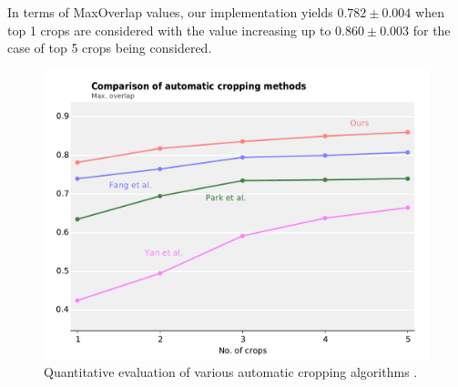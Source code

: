 In terms of \textrm{MaxOverlap} values, our implementation yields $0.782\pm0.004$
when top 1 crops are considered with the value increasing up to $0.860\pm0.003$
for the case of top 5 crops being considered.

\begin{figure}
\centering\includegraphics[width=\columnwidth]{../figures/comparison.pdf}
\caption{Quantitative evaluation of various automatic cropping algorithms
	\cite{fang2014automatic,park2012modeling,yan2013learning}.\label{fig:cropping_comparison}}
\end{figure}

